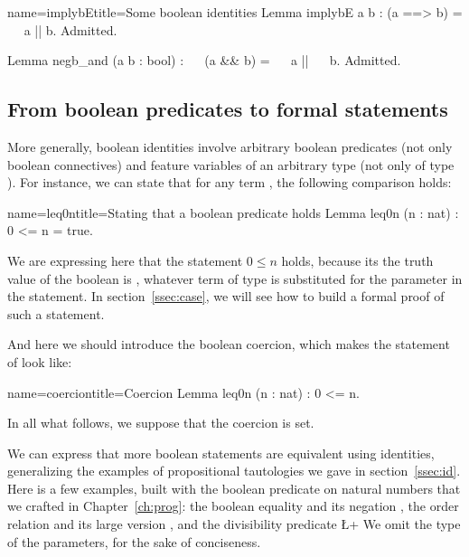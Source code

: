 \begin{coq}{name=implybE}{title=Some boolean identities}
Lemma implybE a b : (a ==> b) = ~~ a || b.
Admitted.

Lemma negb_and (a b : bool) : ~~ (a && b) = ~~ a || ~~ b.
Admitted.
\end{coq}



\subsection{From boolean predicates to formal statements}

More generally, boolean identities involve arbitrary boolean
predicates (not only boolean connectives) and feature variables of
an arbitrary type (not only of type ).
 For instance, we can state
that for any term , the following comparison holds:

\begin{coq}{name=leq0n}{title=Stating that a boolean predicate holds}
Lemma leq0n (n : nat) : 0 <= n = true.
\end{coq}
We are expressing here that the statement $0 \leq n$ holds, because
its the truth value of the boolean  is , whatever
term  of type  is substituted for the parameter  in the
statement. In section~\ref{ssec:case}, we will see how to build a
formal proof of such a statement.


And here we should introduce the boolean coercion, which makes the
statement of  look like:

\begin{coq}{name=coercion}{title=Coercion}
Lemma leq0n (n : nat) : 0 <= n.
\end{coq}

In all what follows, we suppose that the coercion is set.

We can express that more boolean statements are equivalent using
identities, generalizing the examples of propositional tautologies we
gave in section~\ref{ssec:id}. Here is a few examples, built with the
boolean predicate on natural numbers that we crafted in
Chapter~\ref{ch:prog}: the boolean equality \C{==} and its negation
\C{!=}, the order relation \C{<} and its large version \C{<=}, and the
divisibility predicate \L+%
We omit the type of the parameters, for the sake of
conciseness.

